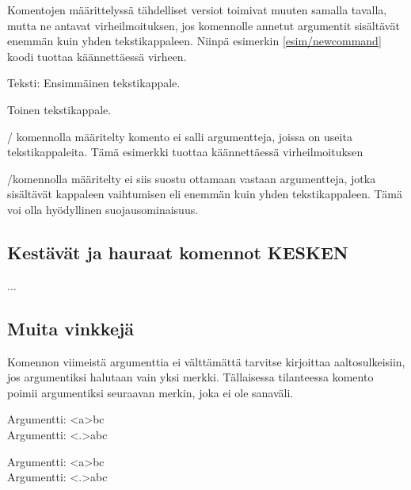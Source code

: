 \noindent
Komentojen määrittelyssä tähdelliset versiot toimivat muuten samalla
tavalla, mutta ne antavat virheilmoituksen, jos komennolle annetut
argumentit sisältävät enemmän kuin yhden tekstikappaleen. Niinpä
esimerkin \ref{esim/newcommand} koodi tuottaa käännettäessä virheen.

\begin{esimerkki*}
\begin{koodilohko}
\newcommand*{\komento}[1]{Teksti: #1}

\komento{
  Ensimmäinen tekstikappale.

  Toinen tekstikappale.
}
\end{koodilohko}
  \caption{\-/ komennolla määritelty komento ei
    salli argumentteja, joissa on useita tekstikappaleita. Tämä
    esimerkki tuottaa käännettäessä virheilmoituksen}
  \label{esim/newcommand}
\end{esimerkki*}

\-/komennolla määritelty  ei siis
suostu ottamaan vastaan argumentteja, jotka sisältävät kappaleen
vaihtumisen eli enemmän kuin yhden tekstikappaleen. Tämä voi olla
hyödyllinen suojausominaisuus.

\subsection{Kestävät ja hauraat komennot KESKEN}

...


\subsection{Muita vinkkejä}

Komennon viimeistä argumenttia ei välttämättä tarvitse kirjoittaa
aaltosulkeisiin, jos argumentiksi halutaan vain yksi merkki. Tällaisessa
tilanteessa komento poimii argumentiksi seuraavan merkin, joka ei ole
sanaväli.

\begin{koodilohkosis}
\newcommand{\x}[1]{Argumentti: <#1>}
\x abc \\
\x.abc
\end{koodilohkosis}

\begin{tulossis}
  Argumentti: <a>bc \\
  Argumentti: <.>abc
\end{tulossis}


